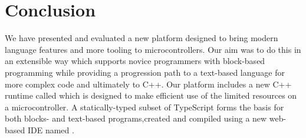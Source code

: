 \section{Conclusion}
\label{sec:conclude}



We have presented and evaluated a new platform designed to bring modern language features and more  tooling to microcontrollers. Our aim was to do this in an extensible way which supports novice programmers with block-based programming while providing a progression path to a text-based language for more complex code and ultimately to C++. Our platform includes a new C++ runtime called \CO which is designed to make efficient use of the limited resources on a microcontroller. A statically-typed subset of TypeScript forms the basis for both blocks- and text-based programs,created and compiled using a new web-based IDE named \MC.

